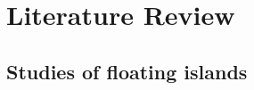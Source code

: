 \chapter{Literature Review}
\label{ch:literaturereview}





\label{ch: background and literature}


\section{Studies of floating islands}
\label{sec: floating islands}



